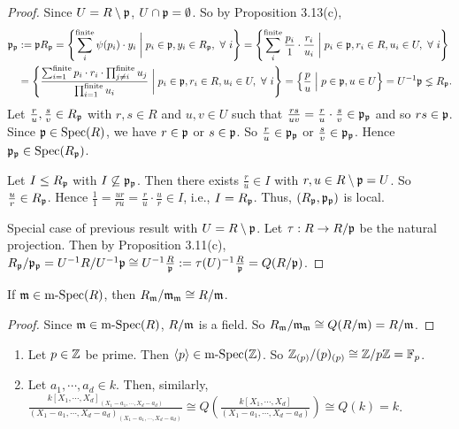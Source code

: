 \begin{proof} 
    Since $U = R \setminus \mathfrak{p}$, $U \cap \mathfrak{p} = \emptyset$. So by Proposition 3.13(c),
    \begin{align*}
        \mathfrak{p}_{\mathfrak{p}} &:= \mathfrak{p} R_{\mathfrak{p}} = \left\{\sum_{i}^{\text{finite}} \psi(p_{i}) \cdot y_{i} \mathrel{\bigg |} p_{i} \in \mathfrak{p},y_{i} \in R_{\mathfrak{p}}, \ \forall \  i\right\} = \left\{\sum_{i}^{\text{finite}} \frac{p_{i}}{1} \cdot \frac{r_{i}}{u_{i}} \mathrel{\bigg |} p_{i} \in \mathfrak{p}, r_{i} \in R, u_{i} \in U, \ \forall \  i\right\} \\
        &= \left\{\frac{\sum_{i=1}^{\text{finite}}p_{i} \cdot r_{i} \cdot \prod_{j \neq i}^{\text{finite}}u_{j}}{\prod_{i=1}^{\text{finite}}u_{i}} \mathrel{\bigg |} p_{i} \in \mathfrak{p}, r_{i} \in R, u_{i} \in U, \ \forall \  i\right\} = \left\{ \frac{p}{u} \mathrel{\Big |} p \in \mathfrak{p}, u \in U\right\} = U^{-1} \mathfrak{p} \lneq R_{\mathfrak{p}}.
    \end{align*}
    Let $\frac{r}{u},\frac{s}{v} \in R_{\mathfrak{p}}$ with $r,s \in R$ and $u,v \in U$ such that $\frac{rs}{uv} = \frac{r}{u} \cdot \frac{s}{v} \in \mathfrak{p}_{\mathfrak{p}}$ and so $rs \in \mathfrak{p}$. Since $\mathfrak{p} \in \operatorname{Spec}(R)$, we have $r \in \mathfrak{p}$ or $s \in \mathfrak{p}$. So $\frac{r}{u} \in \mathfrak{p}_{\mathfrak{p}}$ or $\frac{s}{v} \in \mathfrak{p}_{\mathfrak{p}}$. Hence $\mathfrak{p}_{\mathfrak{p}} \in \operatorname{Spec}(R_{\mathfrak{p}})$. \par 
    Let $I \leq R_{\mathfrak{p}}$ with $I \not \subseteq \mathfrak{p}_{\mathfrak{p}}$. Then there exists $\frac{r}{u} \in I$ with $r,u \in R \setminus \mathfrak{p} = U$. So $\frac{u}{r} \in R_{\mathfrak{p}}$. Hence $\frac{1}{1} = \frac{ur}{ru} = \frac{r}{u} \cdot \frac{u}{r} \in I$, i.e., $I = R_{\mathfrak{p}}$. Thus, $(R_{\mathfrak{p}},\mathfrak{p}_{\mathfrak{p}})$ is local. \par
    Special case of previous result with $U = R \setminus \mathfrak{p}$. Let $\tau: R \to R/\mathfrak{p}$ be the natural projection. Then by Proposition 3.11(c), $R_{\mathfrak{p}}/\mathfrak{p}_{\mathfrak{p}} = U^{-1}R/U^{-1}\mathfrak{p} \cong U^{-1} \frac{R}{\mathfrak{p}} := \tau(U)^{-1} \frac{R}{\mathfrak{p}} = Q(R/\mathfrak{p})$.
\end{proof}

\begin{corollary}
    If $\mathfrak{m} \in \operatorname{m-Spec}(R)$, then $R_{\mathfrak{m}}/\mathfrak{m}_{\mathfrak{m}} \cong R/\mathfrak{m}$.
\end{corollary}

\begin{proof}
    Since $\mathfrak{m} \in \operatorname{m-Spec}(R)$, $R/\mathfrak{m}$ is a field. So $R_{\mathfrak{m}}/\mathfrak{m}_{\mathfrak{m}} \cong Q(R/\mathfrak{m}) = R/\mathfrak{m}$.
\end{proof}

\begin{example*}
    \begin{enumerate}
        \item Let $p \in \mathbb{Z}$ be prime. Then $\langle p \rangle \in \operatorname{m-Spec}(\mathbb{Z})$. So $\mathbb{Z}_{(p)}/(p)_{(p)} \cong \mathbb{Z}/p\mathbb{Z} = \mathbb{F}_p$.
        \item 
            Let $a_1,\cdots,a_d \in k$. Then, similarly, $\frac{k[X_1,\cdots,X_d]_{(X_1-a_1,\cdots,X_d-a_d)}}{(X_1-a_1,\cdots,X_d-a_d)_{(X_1-a_1,\cdots,X_d-a_d)}} \cong Q(\frac{k[X_1,\cdots,X_d]}{(X_1-a_1,\cdots,X_d-a_d)}) \cong Q(k) = k$. 
    \end{enumerate}
\end{example*}

